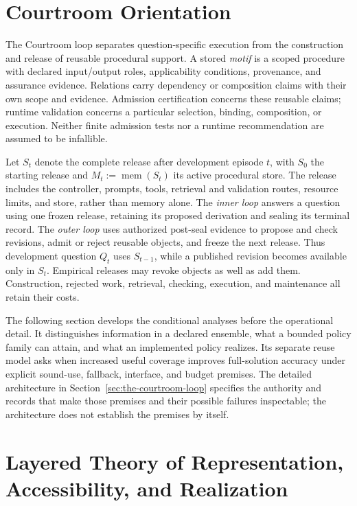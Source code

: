 \documentclass[10pt]{article} %
\providecommand{\1}{\mathbf{1}}  %
\theoremstyle{remark}
\theoremstyle{definition}
\begin{document}
\section{Courtroom Orientation}
\label{sec:courtroom-orientation}

The Courtroom loop separates question-specific execution from the
construction and release of reusable procedural support. A stored
\emph{motif} is a scoped procedure with declared input/output roles,
applicability conditions, provenance, and assurance evidence. Relations
carry dependency or composition claims with their own scope and evidence.
Admission certification concerns these reusable claims; runtime validation
concerns a particular selection, binding, composition, or execution.
Neither finite admission tests nor a runtime recommendation are assumed
to be infallible.

Let $S_t$ denote the complete release after development episode $t$, with
$S_0$ the starting release and $M_t:=\operatorname{mem}(S_t)$ its active
procedural store. The release includes the controller, prompts, tools,
retrieval and validation routes, resource limits, and store, rather than
memory alone. The \emph{inner loop} answers a question using one frozen
release, retaining its proposed derivation and sealing its terminal
record. The \emph{outer loop} uses authorized post-seal evidence to propose
and check revisions, admit or reject reusable objects, and freeze the
next release. Thus development question $Q_t$ uses $S_{t-1}$, while a
published revision becomes available only in $S_t$. Empirical releases
may revoke objects as well as add them. Construction, rejected work,
retrieval, checking, execution, and maintenance all retain their costs.

The following section develops the conditional analyses before the
operational detail. It distinguishes information in a declared ensemble,
what a bounded policy family can attain, and what an implemented policy
realizes. Its separate reuse model asks when increased useful coverage
improves full-solution accuracy under explicit sound-use, fallback,
interface, and budget premises. The detailed architecture in
Section~\ref{sec:the-courtroom-loop} specifies the authority and records
that make those premises and their possible failures inspectable; the
architecture does not establish the premises by itself.

\section{Layered Theory of Representation, Accessibility, and Realization}
\label{sec:theory}
\end{document}
